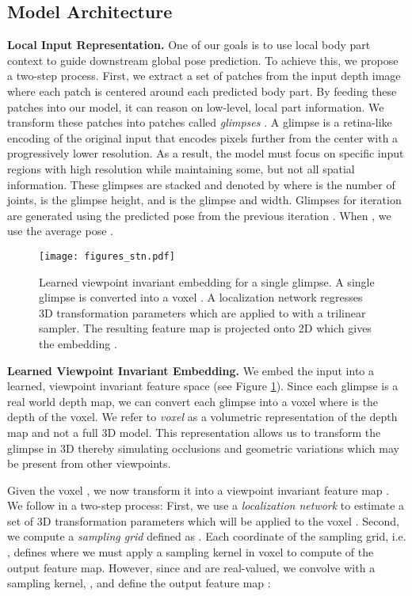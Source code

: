 \documentclass[runningheads]{llncs}
\begin{document}
	\subsection{Model Architecture}\label{sec:architecture}

	\textbf{Local Input Representation.}
	One of our goals is to use local body part context to guide downstream global pose prediction. To achieve this, we propose a two-step process. First, we extract a set of patches from the input depth image where each patch is centered around each predicted body part. By feeding these patches into our model, it can reason on low-level, local part information. We transform these patches into patches called \textit{glimpses} \cite{mnih2014recurrent,larochelle2010learning}.
	A glimpse is a retina-like encoding of the original input that encodes pixels further from the center with a progressively lower resolution.
	As a result, the model must focus on specific input regions with high resolution while maintaining some, but not all spatial information.
	These glimpses are stacked and denoted by  where  is the number of joints,  is the glimpse height, and  is the glimpse and width. Glimpses for iteration  are generated using the predicted pose  from the previous iteration . When , we use the average pose .

	\begin{figure}[t]
		\centering
		\texttt{[image: figures\_stn.pdf]}
		\caption{Learned viewpoint invariant embedding for a single glimpse. A single glimpse  is converted into a voxel . A localization network  regresses 3D transformation parameters  which are applied to  with a trilinear sampler. The resulting feature map  is projected onto 2D which gives the embedding .}
		\label{fig:stn}
	\end{figure}

	\textbf{Learned Viewpoint Invariant Embedding.} We embed the input into a learned, viewpoint invariant feature space (see Figure \ref{fig:stn}). Since each glimpse  is a real world depth map, we can convert each glimpse into a voxel  where  is the depth of the voxel.
	We refer to \textit{voxel} as a volumetric representation of the depth map and not a full 3D model. This representation allows us to transform the glimpse in 3D thereby simulating occlusions and geometric variations which may be present from other viewpoints.

	Given the voxel , we now transform it into a viewpoint invariant feature map .
	We follow \cite{jaderberg2015spatial} in a two-step process:
    First, we use a \textit{localization network}  to estimate a set of 3D transformation parameters  which will be applied to the voxel .
	Second, we compute a \textit{sampling grid} defined as . Each coordinate of the sampling grid, i.e. , defines where we must apply a sampling kernel in voxel  to compute  of the output feature map.
	However, since  and  are real-valued, we convolve  with a sampling kernel, , and define the output feature map :
	
\end{document}
